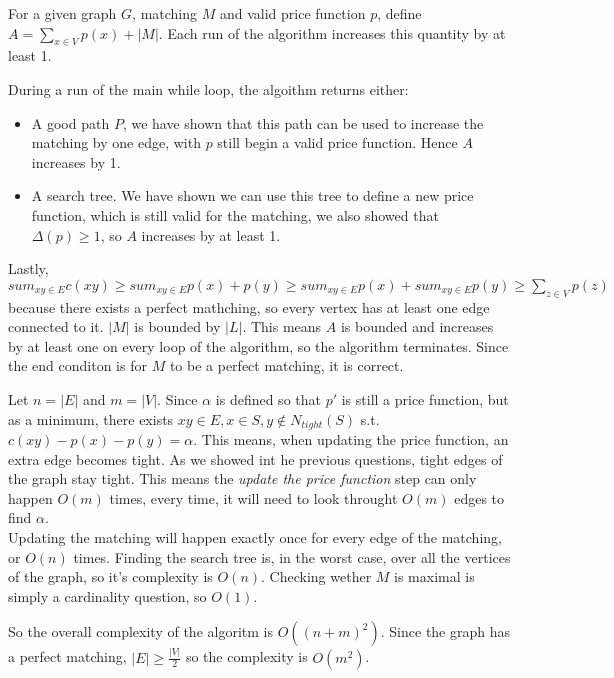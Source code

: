\documentclass{scrartcl}
\begin{document}
For a given graph \( G \), matching \( M \) and valid price function \( p \), define \( A = \sum_{x \in V} p(x) + |M| \). Each run of the algorithm increases this quantity by at least 1.

During a run of the main while loop, the algoithm returns either:
\begin{itemize}
	\item A good path \( P \), we have shown that this path can be used to increase the matching by one edge, with \( p \) still begin a valid price function. Hence \( A \) increases by 1.
	\item A search tree. We have shown we can use this tree to define a new price function, which is still valid for the matching, we also showed that \( \Delta(p) \geq 1 \), so \( A \) increases by at least 1.
\end{itemize}

Lastly, \( sum_{xy \in E}c(xy) \geq sum_{xy \in E}p(x) + p(y) \geq sum_{xy \in E}p(x) + sum_{xy \in E}p(y) \geq \sum_{z \in V}p(z) \) because there exists a perfect mathching, so every vertex has at least one edge connected to it. \( |M| \) is bounded by \( |L| \).
This means \( A \) is bounded and increases by at least one on every loop of the algorithm, so the algorithm terminates. Since the end conditon is for \( M \) to be a perfect matching, it is correct.


Let \( n = |E| \) and \( m = |V| \).
Since \( \alpha \) is defined so that \( p' \) is still a price function, but as a minimum, there exists \( xy \in E, x \in S, y \not \in N_{tight}(S) \)  s.t. \( c(xy) - p(x) - p(y) = \alpha \). This means, when updating the price function, an extra edge becomes tight. As we showed int he previous questions, tight edges of the graph stay tight. This means the \emph{update the price function} step can only happen \( O(m) \) times, every time, it will need to look throught \( O(m) \) edges to find \( \alpha \). \\
Updating the matching will happen exactly once for every edge of the matching, or \( O(n) \) times. Finding the search tree is, in the worst case, over all the vertices of the graph, so it's complexity is \( O(n) \). Checking wether \( M \) is maximal is simply a cardinality question, so \( O(1) \).

So the overall complexity of the algoritm is \( O((n+m)^2) \). Since the graph has a perfect matching, \( |E| \geq \frac{|V|}{2} \) so the complexity is \( O(m^2) \).
\end{document}

